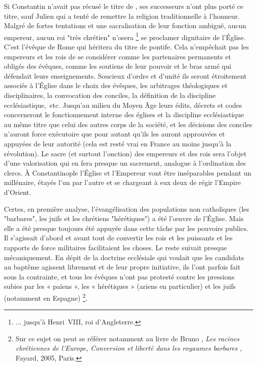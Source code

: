  Si Constantin n'avait pas récusé le titre de , ses successeurs n'ont plus porté ce titre, sauf Julien qui a tenté de remettre la religion traditionnelle à l'honneur. Malgré de fortes tentations et une sacralisation de leur fonction ambiguë, aucun empereur, aucun roi "très chrétien" n'osera
\footnote{... jusqu'à Henri~VIII, roi d'Angleterre.} 
se proclamer dignitaire de l'Église. C'est l'évêque de Rome qui héritera du titre de pontife. Cela n'empêchait pas les empereurs et les rois de se considérer comme les partenaires permanents et obligés des évêques, comme les soutiens de leur pouvoir et le bras armé qui défendait leurs enseignements. Soucieux d'ordre et d'unité ils seront étroitement associés à l'Église dans le choix des évêques, les arbitrages théologiques et disciplinaires, la convocation des conciles, la définition de la discipline ecclésiastique,~etc. Jusqu'au milieu du Moyen Âge leurs édits, décrets et codes concerneront le fonctionnement interne des églises et la discipline ecclésiastique au même titre que celui des autres corps de la société, et les décisions des conciles n'auront force exécutoire que pour autant qu'ils les auront approuvées et appuyées de leur autorité (cela est resté vrai en France au moins jusqu'à la révolution). Le sacre (et surtout l'onction) des empereurs et des rois sera l'objet d'une valorisation qui en fera presque un sacrement, analogue à l'ordination des clercs. À Constantinople l'Église et l'Empereur vont être inséparables pendant un millénaire, étayés l'un par l'autre et se chargeant à eux deux de régir l'Empire d'Orient. 

Certes, en première analyse, l'évangélisation des populations non catholiques (les "barbares", les juifs et les chrétiens "hérétiques") a été l'œuvre de l'Église. Mais elle a été presque toujours été appuyée dans cette tâche par les pouvoirs publics. Il s'agissait d'abord et avant tout de convertir les rois et les puissants et les rapports de force militaires facilitaient les choses. Le reste suivait presque mécaniquement. En dépit de la doctrine ecclésiale qui voulait que les candidats au baptême agissent librement et de leur propre initiative, ils l'ont parfois fait sous la contrainte, et tous les évêques n'ont pas protesté contre les pressions subies par les « païens », les « hérétiques » (ariens en particulier) et les juifs (notamment en Espagne)
\footnote{Sur ce sujet on peut se référer notamment au livre de Bruno , \emph{Les racines chrétiennes de l'Europe, Conversion et liberté dans les royaumes barbares }, Fayard, 2005, Paris.}. 

